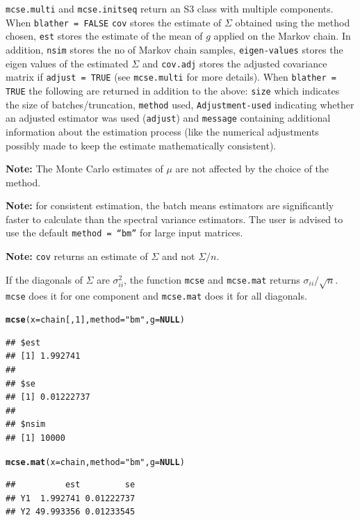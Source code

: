\documentclass[11pt]{article}\usepackage[]{graphicx}\usepackage[]{color}
\makeatletter
\newcommand{\hlnum}[1]{\textcolor[rgb]{0.686,0.059,0.569}{#1}}%
\newcommand{\hlstr}[1]{\textcolor[rgb]{0.192,0.494,0.8}{#1}}%
\newcommand{\hlstd}[1]{\textcolor[rgb]{0.345,0.345,0.345}{#1}}%
\newcommand{\hlkwa}[1]{\textcolor[rgb]{0.161,0.373,0.58}{\textbf{#1}}}%
\newcommand{\hlkwc}[1]{\textcolor[rgb]{0.333,0.667,0.333}{#1}}%
\newcommand{\hlkwd}[1]{\textcolor[rgb]{0.737,0.353,0.396}{\textbf{#1}}}%
\newenvironment{kframe}{%
 \def\at@end@of@kframe{}%
 \ifinner\ifhmode%
  \def\at@end@of@kframe{\end{minipage}}%
  \begin{minipage}{\columnwidth}%
 \fi\fi%
 \def\FrameCommand##1{\hskip\@totalleftmargin \hskip-\fboxsep
 \colorbox{shadecolor}{##1}\hskip-\fboxsep
     \hskip-\linewidth \hskip-\@totalleftmargin \hskip\columnwidth}%
 \MakeFramed {\advance\hsize-\width
   \@totalleftmargin\z@ \linewidth\hsize
   \@setminipage}}%
 {\par\unskip\endMakeFramed%
 \at@end@of@kframe}
\newenvironment{knitrout}{}{} %
\makeatother
\begin{document}
\texttt{mcse.multi} and \texttt{mcse.initseq} return an S3 class with multiple components. When \texttt{blather = FALSE} \texttt{cov} stores the estimate of $\Sigma$ obtained using the method chosen, \texttt{est} stores the estimate of the mean of $g$ applied on the Markov chain. In addition, \texttt{nsim} stores the no of Markov chain samples, \texttt{eigen-values} stores the eigen values of the estimated $\Sigma$ and \texttt{cov.adj} stores the adjusted covariance matrix if \texttt{adjust = TRUE} (see \texttt{mcse.multi} for more details). When \texttt{blather = TRUE} the following are returned in addition to the above: \texttt{size} which indicates the size of batches/truncation, \texttt{method} used, \texttt{Adjustment-used} indicating whether an adjusted estimator was used (\texttt{adjust}) and \texttt{message} containing additional information about the estimation process (like the numerical adjustments possibly made to keep the estimate mathematically consistent).


  
\bigskip  
  
\textbf{Note: } The Monte Carlo estimates of $\mu$ are not affected by the choice of the method.

\bigskip
\textbf{Note: } for consistent estimation, the batch means estimators are significantly faster to calculate than the spectral variance estimators. The user is advised to use the default \texttt{method = ``bm''} for large input matrices.

\bigskip
\textbf{Note: }\texttt{cov} returns an estimate of $\Sigma$ and not $\Sigma/n$. 

\bigskip
If the diagonals of $\Sigma$ are $\sigma_{ii}^2$, the function \texttt{mcse} and \texttt{mcse.mat} returns $\sigma_{ii}/\sqrt{n}$. \texttt{mcse} does it for one component and \texttt{mcse.mat} does it for all diagonals.


\begin{knitrout}
\color{fgcolor}\begin{kframe}
\begin{alltt}
\hlkwd{mcse}\hlstd{(}\hlkwc{x} \hlstd{= chain[,}\hlnum{1}\hlstd{],} \hlkwc{method} \hlstd{=} \hlstr{"bm"}\hlstd{,} \hlkwc{g} \hlstd{=} \hlkwa{NULL}\hlstd{)}
\end{alltt}
\begin{verbatim}
## $est
## [1] 1.992741
## 
## $se
## [1] 0.01222737
## 
## $nsim
## [1] 10000
\end{verbatim}
\begin{alltt}
\hlkwd{mcse.mat}\hlstd{(}\hlkwc{x} \hlstd{= chain,} \hlkwc{method} \hlstd{=} \hlstr{"bm"}\hlstd{,} \hlkwc{g} \hlstd{=} \hlkwa{NULL}\hlstd{)}
\end{alltt}
\begin{verbatim}
##          est         se
## Y1  1.992741 0.01222737
## Y2 49.993356 0.01233545
\end{verbatim}
\end{kframe}
\end{knitrout}
  
\end{document}
